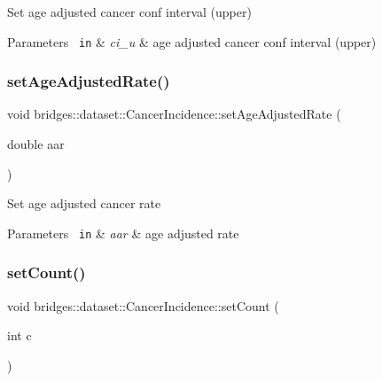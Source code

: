 Set age adjusted cancer conf interval (upper)


\begin{DoxyParams}[1]{Parameters}
\mbox{\texttt{ in}}  & {\em ci\+\_\+u} & age adjusted cancer conf interval (upper) \\
\hline
\end{DoxyParams}
\mbox{\label{classbridges_1_1dataset_1_1_cancer_incidence_a435d5bd5a9c8680c3e2c94c8b7fad79f}} 
\subsubsection{\texorpdfstring{setAgeAdjustedRate()}{setAgeAdjustedRate()}}
{\footnotesize\ttfamily void bridges\+::dataset\+::\+Cancer\+Incidence\+::set\+Age\+Adjusted\+Rate (\begin{DoxyParamCaption}\item[{double}]{aar }\end{DoxyParamCaption})\hspace{0.3cm}{\ttfamily [inline]}}

Set age adjusted cancer rate


\begin{DoxyParams}[1]{Parameters}
\mbox{\texttt{ in}}  & {\em aar} & age adjusted rate \\
\hline
\end{DoxyParams}
\mbox{\label{classbridges_1_1dataset_1_1_cancer_incidence_ac7083b46243f611392d33fc1c2dbce0d}} 
\subsubsection{\texorpdfstring{setCount()}{setCount()}}
{\footnotesize\ttfamily void bridges\+::dataset\+::\+Cancer\+Incidence\+::set\+Count (\begin{DoxyParamCaption}\item[{int}]{c }\end{DoxyParamCaption})\hspace{0.3cm}{\ttfamily [inline]}}



